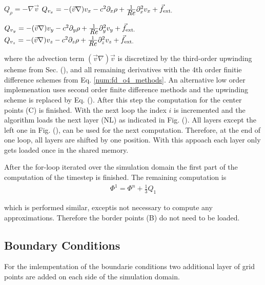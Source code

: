 \begin{algorithmic}
      \STATE ${Q_{\rho} = -\nabla \vec{v}}$
\ENDIF
{}
      \STATE ${Q_{v_x} = -(\vec{v} \nabla) v_x - c^2\partial_x\rho + \frac{1}{\mbox{\textit{Re}}}\partial^2_xv_x + \vec{f}_{\text{ext.}}}$
\ENDIF
\end{algorithmic}
\clearpage

\begin{algorithmic}
      \STATE ${Q_{v_y} = -(\vec{v} \nabla) v_y - c^2\partial_y\rho + \frac{1}{\mbox{\textit{Re}}}\partial^2_yv_y + \vec{f}_{\text{ext.}}}$
\ENDIF
{}
      \STATE ${Q_{v_z} = -(\vec{v} \nabla) v_z - c^2\partial_z\rho + \frac{1}{\mbox{\textit{Re}}}\partial^2_zv_z + \vec{f}_{\text{ext.}}}$
\ENDIF
\end{algorithmic}

where the advection term $(\vec{v}\nabla)\vec{v}$ is discretized by the third-order upwinding scheme from Sec. (),
and all remaining derivatives with the 4th order finitie difference schemes from Eq. \ref{num:fd_o4_methods}.
An alternative low order implemenation uses second order finite difference methods and the upwinding scheme is replaced by Eq. ().
After this step the computation for the center points (C) is finished.
With the next loop the index $i$ is incremented and the algorithm loads the next layer (NL) as indicated in Fig. ().
All layers except the left one in Fig. (), can be used for the next computation.
Therefore, at the end of one loop, all layers are shifted by one position.
With this appoach each layer only gets loaded once in the shared memory.

After the for-loop iterated over the simulation domain the first part of the computation of the timestep is finished.
The remaining computation is
\begin{align}
     \Phi^{1} = \Phi^n + \frac{1}{3}Q_1
\end{align}

which is performed similar, exceptis not necessary to compute any approximations.
Therefore the border points (B) do not need to be loaded.

\subsection{Boundary Conditions}

For the imlempentation of the boundarie conditions two additional layer of grid points
are added on each side of the simulation domain.

